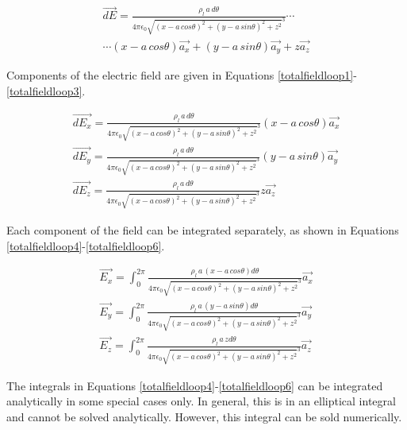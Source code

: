 \documentclass{ximera}
\begin{document}
\begin{eqnarray}
\vec{dE}= \frac{\rho_l \, a \, d\theta }{4 \pi \epsilon_{0} {  \sqrt{(x - a \,cos{\theta})^2 +(y - a \,sin{\theta})^2 +z ^2}  }^3} \cdots  \nonumber \\ \cdots (x -  a \,cos{\theta}) \vec{a_x} +(y - a \,sin{\theta}) \vec{a_y} +z \vec{a_z} \label{totalfieldloop}
\end{eqnarray}

Components of the electric field are given in Equations \ref{totalfieldloop1}-\ref{totalfieldloop3}.


\begin{eqnarray}
\vec{dE_x}= \frac{\rho_l \, a \, d\theta }{4 \pi \epsilon_{0} {  \sqrt{(x - a \,cos{\theta})^2 +(y - a \,sin{\theta})^2 +z ^2}  }^3}   (x -  a \,cos{\theta}) \vec{a_x}  \label{totalfieldloop1} \\
\vec{dE_y}= \frac{\rho_l \, a \, d\theta }{4 \pi \epsilon_{0} {  \sqrt{(x - a \,cos{\theta})^2 +(y - a \,sin{\theta})^2 +z ^2}  }^3}   (y - a \,sin{\theta}) \vec{a_y}  \label{totalfieldloop2} \\
\vec{dE_z}= \frac{\rho_l \, a \, d\theta }{4 \pi \epsilon_{0} {  \sqrt{(x - a \,cos{\theta})^2 +(y - a \,sin{\theta})^2 +z ^2}  }^3}   z \vec{a_z} \label{totalfieldloop3}
\end{eqnarray}

Each component of the field can be integrated separately, as shown in Equations \ref{totalfieldloop4}-\ref{totalfieldloop6}.



\begin{eqnarray}
\vec{E_x}= \int_0^{2\pi}\frac{\rho_l \,a \,        (x -  a \,cos{\theta})         d\theta }{4 \pi \epsilon_{0} {  \sqrt{(x - a \,cos{\theta})^2 +(y - a \,sin{\theta})^2 +z ^2}  }^3}    \vec{a_x}  \label{totalfieldloop4} \\
\vec{E_y}=  \int_0^{2\pi}\frac{\rho_l \, a \,   (y - a \,sin{\theta})   d\theta }{4 \pi \epsilon_{0} {  \sqrt{(x - a \,cos{\theta})^2 +(y - a \,sin{\theta})^2 +z ^2}  }^3}  \vec{a_y}  \label{totalfieldloop5} \\
\vec{E_z}=  \int_0^{2\pi}\frac{\rho_l \, a \,  z   d\theta }{4 \pi \epsilon_{0} {  \sqrt{(x - a \,cos{\theta})^2 +(y - a \,sin{\theta})^2 +z ^2}  }^3}  \vec{a_z} \label{totalfieldloop6}
\end{eqnarray}

The integrals in Equations \ref{totalfieldloop4}-\ref{totalfieldloop6}  can be integrated analytically in some special cases only. In general, this is in an elliptical integral and cannot be solved analytically. However, this integral can be sold numerically.
\end{document}
